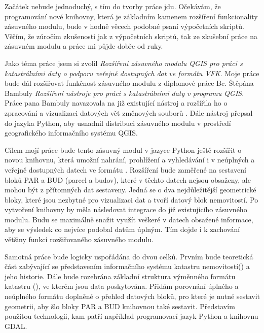 Začátek nebude jednoduchý, s tím do tvorby práce jdu. Očekávám, že
programování nové knihovny, která je základním kamenem rozšíření
funkcionality zásuvného modulu, bude v hodně věcech podobné psaní
výpočetních skriptů.  Věřím, že zúročím zkušenosti jak z výpočetních
skriptů, tak ze zkušební práce na zásuvném modulu a práce mi půjde
dobře od ruky.

Jako téma práce jsem si zvolil \textit{Rozšíření zásuvného modulu QGIS
  pro práci s katastrálními daty o podporu veřejně dostupných dat ve
  formátu VFK}.  Moje práce bude dál rozšiřovat funkčnost zásuvného
modulu z diplomové práce Bc. Štěpána Bambuly \textit{Rozšíření
  nástroje pro práci s katastrálními daty v programu QGIS}. Práce pana
Bambuly navazovala na již existující nástroj a rozšířila ho o
zpracování a vizualizaci datových vět změnových souborů . Dále
nástroj přepsal do jazyka Python, aby usnadnil distribuci zásuvného
modulu v prostředí geografického informačního systému QGIS.

Cílem mojí práce bude tento zásuvný modul v jazyce Python ještě
rozšířit o novou knihovnu, která umožní nahrání, prohlížení a
vyhledávání i v neúplných a veřejně dostupných datech ve formátu
. Rozšíření bude zaměřené na sestavení bloků PAR a BUD (parcel
a budov), které v těchto datech nejsou obsaženy, ale mohou být z
přítomných dat sestaveny. Jedná se o dva nejdůležitější geometrické
bloky, které jsou nezbytné pro vizualizaci dat a tvoří datový blok
nemovitostí. Po vytvoření knihovny by měla následovat integrace do již
existujícího zásuvného modulu. Budu se maximálně snažit využít veškeré
v datech obsažené informace, aby se výsledek co nejvíce podobal datům
úplným. Tím dojde i k zachování většiny funkcí rozšiřovaného zásuvného
modulu.

Samotná práce bude logicky uspořádána do dvou celků. Prvním bude
teoretická část zabývající se představením informačního systému
katastru nemovitostí() a jeho historie. Dále bude rozebrána
základní struktura výměnného formátu katastru (), ve kterém
jsou data poskytována. Přidám porovnání úplného a neúplného formátu
doplněné o přehled datových bloků, pro které je nutné sestavit
geometrii, aby šlo bloky PAR a BUD knihovnou také sestavit. Představím
použitou technologii, kam patří například programovací jazyk Python a
knihovnu GDAL.

